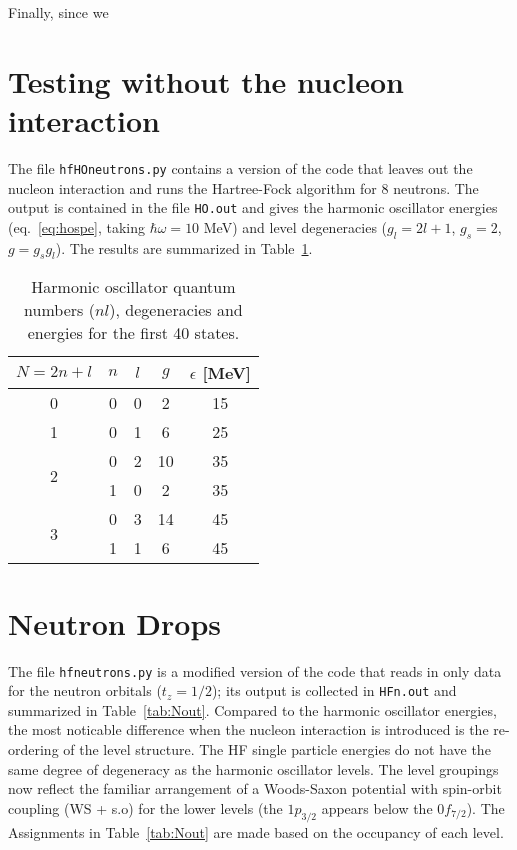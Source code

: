 \documentclass[]{scrartcl}
\begin{document}
Finally, since we

\section*{Testing without the nucleon interaction}

The file \texttt{hfHOneutrons.py} contains a version of the code that leaves out the nucleon interaction and runs the Hartree-Fock algorithm for 8 neutrons. The output is contained in the file \texttt{HO.out} and gives the harmonic oscillator energies (eq.~\ref{eq:hospe}, taking $\hbar \omega = 10$ MeV) and level degeneracies ($g_l=2l+1$, $g_s = 2$, $g=g_s g_l$). The results are summarized in Table~\ref{tab:HOout}.

\begin{table}[h]
\centering
	\begin{tabular}{ c | c c c | c }
	$N=2n + l$ & $n$ & $l$ & $g$ & $\epsilon$ [MeV]\\
\hline
	0 & 0 & 0 & 2 & 15 \\
\hline
	1 & 0 & 1 & 6 & 25\\
\hline
	\multirow{2}{*}{2} & 0 & 2 & 10 & 35 \\
	 & 1 & 0 & 2 & 35\\
\hline
	\multirow{2}{*}{3} & 0 & 3 & 14 & 45\\
	 & 1 & 1 & 6 & 45\\
\hline
	\end{tabular}
	\caption{Harmonic oscillator quantum numbers ($nl$), degeneracies and energies for the first 40 states.}
	\label{tab:HOout}
\end{table}

\section*{Neutron Drops}

The file \texttt{hfneutrons.py} is a modified version of the code that reads in only data for the neutron orbitals ($t_z = 1/2$); its output is collected in \texttt{HFn.out} and summarized in Table~\ref{tab:Nout}. Compared to the harmonic oscillator energies, the most noticable difference when the nucleon interaction is introduced is the re-ordering of the level structure. The HF single particle energies do not have the same degree of degeneracy as the harmonic oscillator levels. The level groupings now reflect the familiar arrangement of a Woods-Saxon potential with spin-orbit coupling (WS + s.o) for the lower levels (the $1 p _{3/2}$ appears below the $0 f _{7/2}$). The  Assignments in Table~\ref{tab:Nout} are made based on the occupancy of each level.
\end{document}
